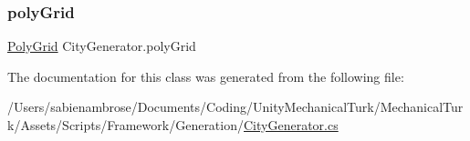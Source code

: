 \subsubsection{\texorpdfstring{poly\+Grid}{polyGrid}}
{\footnotesize\ttfamily \mbox{\hyperlink{class_poly_grid}{Poly\+Grid}} City\+Generator.\+poly\+Grid}



The documentation for this class was generated from the following file\+:\begin{DoxyCompactItemize}
\item 
/\+Users/sabienambrose/\+Documents/\+Coding/\+Unity\+Mechanical\+Turk/\+Mechanical\+Turk/\+Assets/\+Scripts/\+Framework/\+Generation/\mbox{\hyperlink{_city_generator_8cs}{City\+Generator.\+cs}}\end{DoxyCompactItemize}
